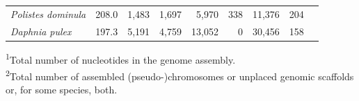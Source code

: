 \begin{table}[t]
\begin{tabularx}{\textwidth}{lrrrrrrrr}
\textit{Polistes dominula}          &                  208.0 &                     1,483 &        1,697 &        5,970 &          338 &       11,376 &          204   \\
\textit{Daphnia pulex}              &                  197.3 &                     5,191 &        4,759 &       13,052 &            0 &       30,456 &          158   \\ \hline
\end{tabularx}
\raggedright
{\scriptsize
\textsuperscript{1}Total number of nucleotides in the genome assembly. \\
\textsuperscript{2}Total number of assembled (pseudo-)chromosomes or unplaced genomic scaffolds or, for some species, both. \\
}
\end{table}

